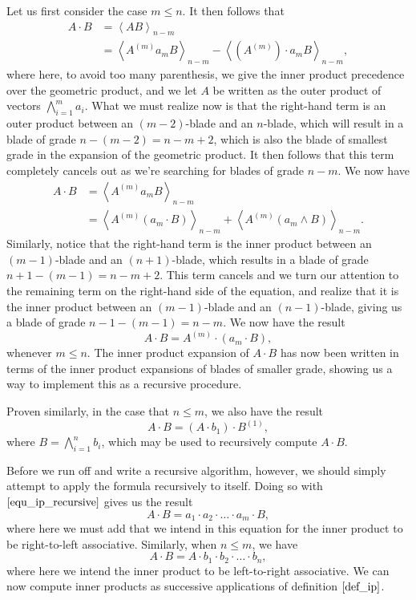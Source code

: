 \documentclass{article}
\begin{document}
Let us first consider the case $m\leq n$.  It then follows that
\begin{align*}
A\cdot B &= \left\langle AB\right\rangle_{n-m} \\
 &= \left\langle A^{(m)}a_mB\right\rangle_{n-m}-\left\langle
 (A^{(m)})\cdot a_m B\right\rangle_{n-m},
\end{align*}
where here, to avoid too many parenthesis, we give the inner product precedence
over the geometric product, and we let $A$ be written as the outer product
of vectors $\bigwedge_{i=1}^m a_i$.  What we must realize now is that the right-hand
term is an outer product between an $(m-2)$-blade and an $n$-blade, which will result in
a blade of grade $n-(m-2)=n-m+2$, which is also the blade of smallest grade
in the expansion of the geometric product.  It then follows that this term completely cancels
out as we're searching for blades of grade $n-m$.  We now have
\begin{align*}
A\cdot B &= \left\langle
 A^{(m)}a_mB\right\rangle_{n-m} \\
 &= \left\langle
 A^{(m)}(a_m\cdot B)\right\rangle_{n-m} +
 \left\langle
 A^{(m)}(a_m\wedge B)\right\rangle_{n-m}.
\end{align*}
Similarly, notice that the right-hand term is the inner product between
an $(m-1)$-blade and an $(n+1)$-blade, which results in a blade of grade $n+1-(m-1)=n-m+2$.
This term cancels and we turn our attention to the remaining term on the right-hand
side of the equation, and realize that it is the inner product between
an $(m-1)$-blade and an $(n-1)$-blade, giving us a blade of grade $n-1-(m-1)=n-m$.
We now have the result
\begin{equation}\label{equ_ip_recursive}
A\cdot B = A^{(m)}\cdot(a_m\cdot B),
\end{equation}
whenever $m\leq n$.  The inner product expansion of $A\cdot B$ has now been written
in terms of the inner product expansions of blades of smaller grade, showing us a
way to implement this as a recursive procedure.

Proven similarly, in the case that $n\leq m$, we also have the result
\begin{equation*}
A\cdot B = (A\cdot b_1)\cdot B^{(1)},
\end{equation*}
where $B=\bigwedge_{i=1}^n b_i$, which may be used to recursively compute
$A\cdot B$.

Before we run off and write a recursive algorithm, however, we should
simply attempt to apply the formula recursively to itself.  Doing so with
$\eqref{equ_ip_recursive}$ gives us the result
\begin{equation*}
A\cdot B = a_1\cdot a_2\cdot\dots\cdot a_m\cdot B,
\end{equation*}
where here we must add that we intend in this equation for the inner product
to be right-to-left associative.  Similarly, when $n\leq m$, we have
\begin{equation*}
A\cdot B = A\cdot b_1\cdot b_2\cdot\dots\cdot b_n,
\end{equation*}
where here we intend the inner product to be left-to-right associative.
We can now compute inner products as successive applications of
definition $\eqref{def_ip}$.
\end{document}
